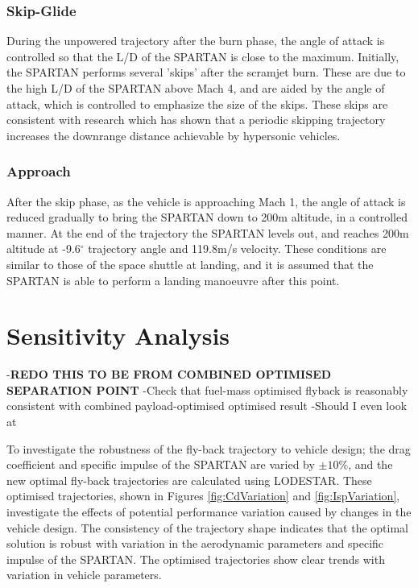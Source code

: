 \documentclass[journal]{new-aiaa} %
\begin{document}
\subsubsection{ Skip-Glide}
During the unpowered trajectory after the burn phase, the angle of attack is controlled so that the L/D of the SPARTAN is close to the maximum. Initially, the SPARTAN performs several 'skips' after the scramjet burn. These are due to the high L/D of the SPARTAN above Mach 4, and are aided by the angle of attack, which is controlled to emphasize the size of the skips. These skips are consistent with research which has shown that a periodic skipping trajectory increases the downrange distance achievable by hypersonic vehicles\cite{Eggers1957,Kanda2007}. 


\subsubsection{ Approach}
After the skip phase, as the vehicle is approaching Mach 1, the angle of attack is reduced gradually to bring the SPARTAN down to 200m altitude, in a controlled manner. 
 At the end of the trajectory the SPARTAN levels out, and reaches 200m altitude at -9.6$^\circ$ trajectory angle and 119.8m/s velocity. These conditions are similar to those of the space shuttle at landing\cite{Ryba2017}, and it is assumed that the SPARTAN is able to perform a landing manoeuvre after this point. 





\section{Sensitivity Analysis}
-\textbf{REDO THIS TO BE FROM COMBINED OPTIMISED SEPARATION POINT}
-Check that fuel-mass optimised flyback is reasonably consistent with combined payload-optimised optimised result
-Should I even look at 

To investigate the robustness of the fly-back trajectory to vehicle design; the drag coefficient and specific impulse of the SPARTAN are varied by $\pm 10\%$, and the new optimal fly-back trajectories are calculated using LODESTAR. These optimised trajectories, shown in Figures \ref{fig:CdVariation} and \ref{fig:IspVariation}, investigate the effects of potential performance variation caused by changes in the vehicle design.
The consistency of the trajectory shape indicates that the optimal solution is robust with variation in the aerodynamic parameters and specific impulse of the SPARTAN. The optimised trajectories show clear trends with variation in vehicle parameters.
\end{document}

